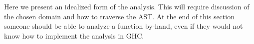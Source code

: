 Here we present an idealized form of the analysis.
This will require discussion of the chosen domain and how to traverse the AST.
At the end of this section someone should be able to analyze a function by-hand, even if they would not know how to implement the analysis in GHC.
